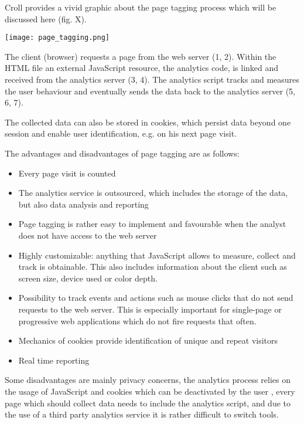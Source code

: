 Croll provides a vivid graphic about the page tagging process which will be discussed here (fig. X). %

\begin{center}
\texttt{[image: page\_tagging.png]}
\end{center}

The client (browser) requests a page from the web server (1, 2).
Within the HTML file an external JavaScript resource, the analytics code, is linked and received from the analytics server (3, 4).
The analytics script tracks and measures the user behaviour and eventually sends the data back to the analytics server (5, 6, 7).

The collected data can also be stored in cookies, which persist data beyond one session and enable user identification, e.g. on his next page visit. %


The advantages and disadvantages of page tagging are as follows:

\begin{itemize}
\item Every page visit is counted %
\item The analytics service is outsourced, which includes the storage of the data, but also data analysis and reporting %
\item Page tagging is rather easy to implement and favourable when the analyst does not have access to the web server %
\item Highly customizable: anything that JavaScript allows to measure, collect and track is obtainable. This also includes information about the client such as screen size, device used or color depth. %
\item Possibility to track events and actions such as mouse clicks that do not send requests to the web server. This is especially important for single-page or progressive web applications which do not fire requests that often. %
\item Mechanics of cookies provide identification of unique and repeat visitors %
\item Real time reporting %
\end{itemize}



Some disadvantages are mainly privacy concerns, the analytics process relies on the usage of JavaScript and cookies which can be deactivated by the user %
, every page which should collect data needs to include the analytics script, and due to the use of a third party analytics service it is rather difficult to switch tools. %


